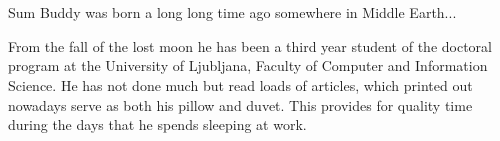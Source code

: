 \graphicspath{{img/}}










\appendix
\section{\biographyname}
Sum Buddy was born a long long time ago somewhere in Middle Earth...

From the fall of the lost moon he has been a third year student of the doctoral program at the University of Ljubljana, Faculty of Computer and Information Science. He has not done much but read loads of articles, which printed out nowadays serve as both his pillow and duvet. This provides for quality time during the days that he spends sleeping at work. 


